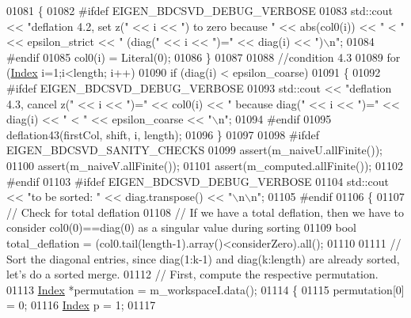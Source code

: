\begin{DoxyCode}
01081     \{
01082 \textcolor{preprocessor}{#ifdef  EIGEN\_BDCSVD\_DEBUG\_VERBOSE}
01083       std::cout << \textcolor{stringliteral}{"deflation 4.2, set z("} << i << \textcolor{stringliteral}{") to zero because "} << abs(col0(i)) << \textcolor{stringliteral}{" < "} << 
      epsilon\_strict << \textcolor{stringliteral}{"  (diag("} << i << \textcolor{stringliteral}{")="} << diag(i) << \textcolor{stringliteral}{")\(\backslash\)n"};
01084 \textcolor{preprocessor}{#endif}
01085       col0(i) = Literal(0);
01086     \}
01087 
01088   \textcolor{comment}{//condition 4.3}
01089   \textcolor{keywordflow}{for} (\hyperlink{namespace_eigen_a62e77e0933482dafde8fe197d9a2cfde}{Index} i=1;i<length; i++)
01090     \textcolor{keywordflow}{if} (diag(i) < epsilon\_coarse)
01091     \{
01092 \textcolor{preprocessor}{#ifdef  EIGEN\_BDCSVD\_DEBUG\_VERBOSE}
01093       std::cout << \textcolor{stringliteral}{"deflation 4.3, cancel z("} << i << \textcolor{stringliteral}{")="} << col0(i) << \textcolor{stringliteral}{" because diag("} << i << \textcolor{stringliteral}{")="} << 
      diag(i) << \textcolor{stringliteral}{" < "} << epsilon\_coarse << \textcolor{stringliteral}{"\(\backslash\)n"};
01094 \textcolor{preprocessor}{#endif}
01095       deflation43(firstCol, shift, i, length);
01096     \}
01097 
01098 \textcolor{preprocessor}{#ifdef EIGEN\_BDCSVD\_SANITY\_CHECKS}
01099   assert(m\_naiveU.allFinite());
01100   assert(m\_naiveV.allFinite());
01101   assert(m\_computed.allFinite());
01102 \textcolor{preprocessor}{#endif}
01103 \textcolor{preprocessor}{#ifdef EIGEN\_BDCSVD\_DEBUG\_VERBOSE}
01104   std::cout << \textcolor{stringliteral}{"to be sorted: "} << diag.transpose() << \textcolor{stringliteral}{"\(\backslash\)n\(\backslash\)n"};
01105 \textcolor{preprocessor}{#endif}
01106   \{
01107     \textcolor{comment}{// Check for total deflation}
01108     \textcolor{comment}{// If we have a total deflation, then we have to consider col0(0)==diag(0) as a singular value during
       sorting}
01109     \textcolor{keywordtype}{bool} total\_deflation = (col0.tail(length-1).array()<considerZero).all();
01110     
01111     \textcolor{comment}{// Sort the diagonal entries, since diag(1:k-1) and diag(k:length) are already sorted, let's do a
       sorted merge.}
01112     \textcolor{comment}{// First, compute the respective permutation.}
01113     \hyperlink{namespace_eigen_a62e77e0933482dafde8fe197d9a2cfde}{Index} *permutation = m\_workspaceI.data();
01114     \{
01115       permutation[0] = 0;
01116       \hyperlink{namespace_eigen_a62e77e0933482dafde8fe197d9a2cfde}{Index} p = 1;
01117       

\end{DoxyCode}
